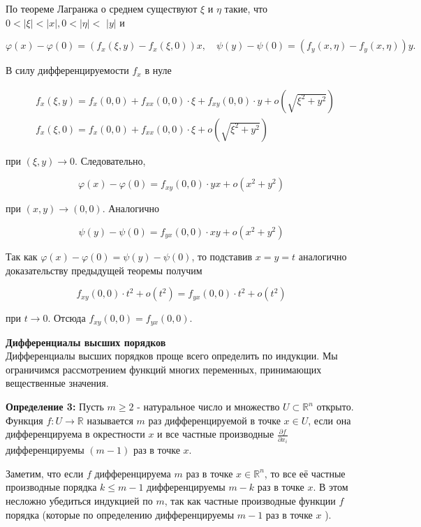 \documentclass[a4paper,12pt]{article} %
\begin{document}
По теореме Лагранжа о среднем существуют $\xi$ и $\eta$ такие, что $0<|\xi|<|x|, 0<|\eta|<$ $|y|$ и

$$
\varphi(x)-\varphi(0)=\left(f_{x}(\xi, y)-f_{x}(\xi, 0)\right) x, \quad \psi(y)-\psi(0)=\left(f_{y}(x, \eta)-f_{y}(x, \eta)\right) y .
$$

В силу дифференцируемости $f_{x}$ в нуле

$$
\begin{aligned}
& f_{x}(\xi, y)=f_{x}(0,0)+f_{x x}(0,0) \cdot \xi+f_{x y}(0,0) \cdot y+o\left(\sqrt{\xi^{2}+y^{2}}\right) \\
& f_{x}(\xi, 0)=f_{x}(0,0)+f_{x x}(0,0) \cdot \xi+o\left(\sqrt{\xi^{2}+y^{2}}\right)
\end{aligned}
$$

при $(\xi, y) \rightarrow 0$. Следовательно,

$$
\varphi(x)-\varphi(0)=f_{x y}(0,0) \cdot y x+o\left(x^{2}+y^{2}\right)
$$

при $(x, y) \rightarrow(0,0)$. Аналогично

$$
\psi(y)-\psi(0)=f_{y x}(0,0) \cdot x y+o\left(x^{2}+y^{2}\right)
$$

Так как $\varphi(x)-\varphi(0)=\psi(y)-\psi(0)$, то подставив $x=y=t$ аналогично доказательству предыдущей теоремы получим

$$
f_{x y}(0,0) \cdot t^{2}+o\left(t^{2}\right)=f_{y x}(0,0) \cdot t^{2}+o\left(t^{2}\right)
$$

при $t \rightarrow 0$. Отсюда $f_{x y}(0,0)=f_{y x}(0,0)$.

\textbf{Дифференциалы высших порядков}\\
Дифференциалы высших порядков проще всего определить по индукции. Мы ограничимся рассмотрением функций многих переменных, принимающих вещественные значения.

\textbf{Определение 3:} Пусть $m \geq 2$ - натуральное число и множество $U \subset \mathbb{R}^{n}$ открыто. Функция $f: U \rightarrow \mathbb{R}$ называется $m$ раз дифференцируемой в точке $x \in U$, если она дифференцируема в окрестности $x$ и все частные производные $\frac{\partial f}{\partial x_{i}}$ дифференцируемы $(m-1)$ раз в точке $x$.

Заметим, что если $f$ дифференцируема $m$ раз в точке $x \in \mathbb{R}^{n}$, то все её частные производные порядка $k \leq m-1$ дифференцируемы $m-k$ раз в точке $x$. В этом несложно убедиться индукцией по $m$, так как частные производные функции $f$ порядка
(которые по определению дифференцируемы $m-1$ раз в точке $x$ ).
\end{document}
